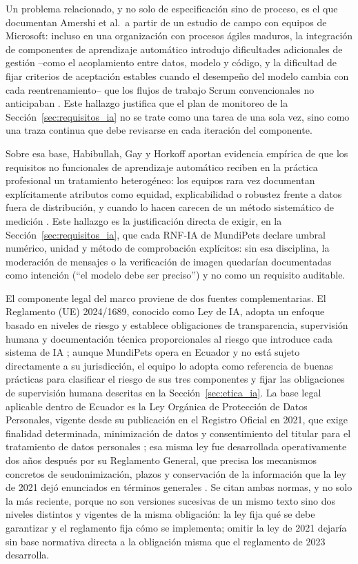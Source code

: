 \documentclass[journal,onecolumn]{IEEEtran}
\begin{document}
	Un problema relacionado, y no solo de especificación sino de proceso, es el que documentan
	Amershi et al.\ a partir de un estudio de campo con equipos de Microsoft: incluso en una
	organización con procesos ágiles maduros, la integración de componentes de aprendizaje
	automático introdujo dificultades adicionales de gestión --como el acoplamiento entre datos,
	modelo y código, y la dificultad de fijar criterios de aceptación estables cuando el
	desempeño del modelo cambia con cada reentrenamiento-- que los flujos de trabajo Scrum
	convencionales no anticipaban \cite{amershi2019}. Este hallazgo justifica que el plan de
	monitoreo de la Sección~\ref{sec:requisitos_ia} no se trate como una tarea de una sola vez,
	sino como una traza continua que debe revisarse en cada iteración del componente.
	
	Sobre esa base, Habibullah, Gay y Horkoff aportan evidencia empírica de que los requisitos no
	funcionales de aprendizaje automático reciben en la práctica profesional un tratamiento
	heterogéneo: los equipos rara vez documentan explícitamente atributos como equidad,
	explicabilidad o robustez frente a datos fuera de distribución, y cuando lo hacen carecen de
	un método sistemático de medición \cite{habibullah2023}. Este hallazgo es la justificación
	directa de exigir, en la Sección~\ref{sec:requisitos_ia}, que cada RNF-IA de MundiPets declare
	umbral numérico, unidad y método de comprobación explícitos: sin esa disciplina, la moderación
	de mensajes o la verificación de imagen quedarían documentadas como intención (``el modelo debe
	ser preciso'') y no como un requisito auditable.
	
	El componente legal del marco proviene de dos fuentes complementarias. El Reglamento (UE)
	2024/1689, conocido como Ley de IA, adopta un enfoque basado en niveles de riesgo y establece
	obligaciones de transparencia, supervisión humana y documentación técnica proporcionales al
	riesgo que introduce cada sistema de IA \cite{euaiact2024}; aunque MundiPets opera en Ecuador y
	no está sujeto directamente a su jurisdicción, el equipo lo adopta como referencia de buenas
	prácticas para clasificar el riesgo de sus tres componentes y fijar las obligaciones de
	supervisión humana descritas en la Sección~\ref{sec:etica_ia}. La base legal aplicable dentro
	de Ecuador es la Ley Orgánica de Protección de Datos Personales, vigente desde su publicación
	en el Registro Oficial en 2021, que exige finalidad determinada, minimización de datos y
	consentimiento del titular para el tratamiento de datos personales \cite{lopdp2021}; esa misma
	ley fue desarrollada operativamente dos años después por su Reglamento General, que precisa los
	mecanismos concretos de seudonimización, plazos y conservación de la información que la ley de
	2021 dejó enunciados en términos generales \cite{lopdp_reglamento2023}. Se citan ambas normas,
	y no solo la más reciente, porque no son versiones sucesivas de un mismo texto sino dos niveles
	distintos y vigentes de la misma obligación: la ley fija qué se debe garantizar y el reglamento
	fija cómo se implementa; omitir la ley de 2021 dejaría sin base normativa directa a la
	obligación misma que el reglamento de 2023 desarrolla.
	
\end{document}
